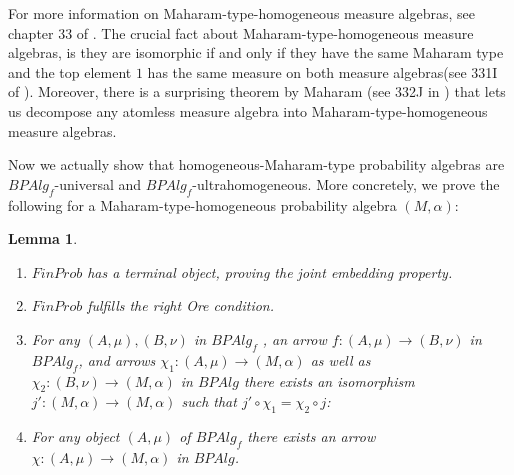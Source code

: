 \documentclass[a4paper]{amsproc}
\theoremstyle{plain}
\newtheorem{lemma}[theorem]{Lemma}
\theoremstyle{definition}
\theoremstyle{remark}
\numberwithin{equation}{section}
\begin{document}
For more information on Maharam-type-homogeneous measure algebras, see chapter 33 of \cite{fremlin}. The crucial fact about Maharam-type-homogeneous measure algebras, is they are isomorphic if and only if they have the same Maharam type and the top element $1$ has the same measure on both measure algebras(see 331I of \cite{fremlin}). Moreover, there is a surprising theorem by Maharam (see 332J in \cite{fremlin}) that lets us decompose any atomless measure algebra into Maharam-type-homogeneous measure algebras.

Now we actually show that homogeneous-Maharam-type probability algebras are $BPAlg_f$-universal and $BPAlg_f$-ultrahomogeneous. More concretely, we prove the following for a Maharam-type-homogeneous probability algebra $(M, \alpha)$:

\begin{lemma}\begin{enumerate}
\item $FinProb$ has a terminal object, proving the joint embedding property.
\item $FinProb$ fulfills the right Ore condition.
\item For any $(A,\mu),(B,\nu)$ in $BPAlg_f$ , an arrow $f:(A,\mu)\rightarrow (B,\nu)$ in \\
 $BPAlg_f$, and arrows $\chi_1:(A,\mu)\rightarrow (M, \alpha)$ as well as $\chi_2:(B,\nu)\rightarrow (M, \alpha)$ in $BPAlg$ there exists an isomorphism $j':(M, \alpha) \rightarrow (M, \alpha)$ such that $j'\circ \chi_1=\chi_2\circ j$:
 \begin{center}
 \end{center}
\item For any object $(A,\mu)$ of $BPAlg_f$ there exists an arrow $\chi:(A,\mu)\rightarrow (M, \alpha)$ in $BPAlg$.
\end{enumerate}
\end{lemma}
\end{document}
